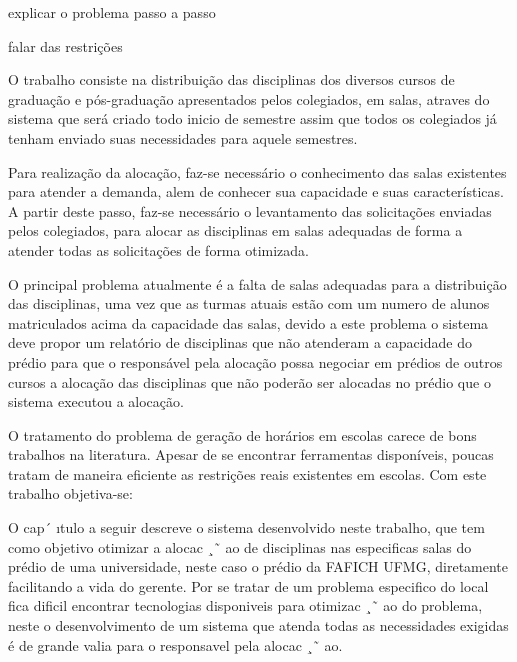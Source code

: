 \sumario
{}


explicar o problema passo a passo

falar das restrições


O trabalho consiste na distribuição das disciplinas dos diversos cursos de graduação e pós-graduação apresentados pelos colegiados, em salas, atraves do sistema que será criado todo inicio de semestre assim que todos os colegiados já tenham enviado suas necessidades para aquele semestres.\par

Para realização da alocação, faz-se necessário o conhecimento das salas existentes para atender a demanda, alem de conhecer sua capacidade e suas características. A partir deste passo, faz-se necessário o levantamento das solicitações enviadas pelos colegiados, para alocar as disciplinas em salas adequadas de forma a atender todas as solicitações de forma otimizada.\par

O principal problema atualmente é a falta de salas adequadas para a distribuição das disciplinas, uma vez que as turmas atuais estão com um numero de alunos matriculados acima da capacidade das salas, devido a este problema o sistema deve propor um relatório de disciplinas que não atenderam a capacidade do prédio para que o responsável pela alocação possa negociar em prédios de outros cursos a alocação das disciplinas que não poderão ser alocadas no prédio que o sistema executou a alocação.\par



O tratamento do problema de geração de horários em escolas carece de bons
trabalhos na literatura. Apesar de se encontrar ferramentas disponíveis, poucas tratam de
maneira eficiente as restrições reais existentes em escolas. Com este trabalho objetiva-se:


O cap´ ıtulo a seguir descreve o sistema desenvolvido neste trabalho, que tem como objetivo
otimizar a alocac ¸˜ ao de disciplinas nas especificas salas do prédio de uma universidade, neste
caso o prédio da FAFICH UFMG, diretamente facilitando a vida do gerente. Por se tratar de um
problema especifico do local fica dificil encontrar tecnologias disponiveis para otimizac ¸˜ ao do
problema, neste o desenvolvimento de um sistema que atenda todas as necessidades exigidas é
de grande valia para o responsavel pela alocac ¸˜ ao.


